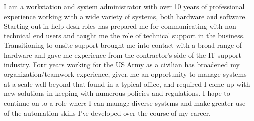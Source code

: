 \documentclass[..\main.tex]{subfiles}
\begin{document}
I am a workstation and system administrator with over 10 years of professional 
experience working with a wide variety of systems, both hardware and software. 
Starting out in help desk roles has prepared me for communicating with non 
technical end users and taught me the role of technical support in the business. 
Transitioning to onsite support brought me into contact with a broad range of 
hardware and gave me experience from the contractor's side of the IT support industry. 
Four years working for the US Army as a civilian has broadened my organization/teamwork 
experience, given me an opportunity to manage systems at a scale well beyond 
that found in a typical office, and required I come up with new solutions in 
keeping with numerous policies and regulations. I hope to continue on to a 
role where I can manage diverse systems and make greater use of the automation 
skills I've developed over the course of my career. 
\end{document}
